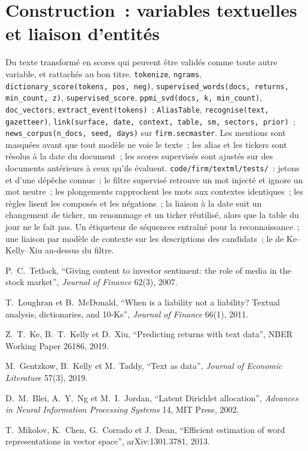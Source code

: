 \section{Construction~: variables textuelles et liaison d'entités}\label{bld:ml:text-from-bag-of-words-to-embeddings:textml}

\begin{build}
 Du texte transformé en scores qui peuvent être validés comme toute autre variable, et rattachés au bon titre.
 \texttt{tokenize}, \texttt{ngrams}, \texttt{dictionary\_score(tokens, pos, neg)},
\texttt{supervised\_words(docs, returns, min\_count, z)}, \texttt{supervised\_score},
\texttt{ppmi\_svd(docs, k, min\_count)}, \texttt{doc\_vectors}, \texttt{extract\_event(tokens)}~; \texttt{AliasTable},
\texttt{recognise(text, gazetteer)}, \texttt{link(surface, date, context, table, sm, sectors, prior)}~; \texttt{news\_corpus(n\_docs, seed, days)}
sur \texttt{firm.secmaster}.
 Les mentions sont masquées avant que tout modèle ne voie le texte~; les alias et les tickers sont résolus à la date du
document~; les scores supervisés sont ajustés sur des documents antérieurs à ceux qu'ils évaluent.
 \texttt{code/firm/textml/tests/}~: jetons et  d'une dépêche connue~; le filtre supervisé
retrouve un mot injecté et ignore un mot neutre~; les plongements rapprochent les mots aux contextes identiques~; les règles lisent
les composés et les négations~; la liaison à la date suit un changement de ticker, un renommage et un ticker réutilisé, alors que la table du jour ne
le fait pas.
 Un étiqueteur de séquences entraîné pour la reconnaissance~; une liaison par modèle de contexte sur les descriptions des candidats~;
le  de Ke--Kelly--Xiu au-dessus du filtre.
\end{build}

\begin{omsources}
\item P.~C.~Tetlock, ``Giving content to investor sentiment: the role of media in the stock market'', \emph{Journal of
Finance} 62(3), 2007.
\item T.~Loughran et B.~McDonald, ``When is a liability not a liability? Textual analysis, dictionaries, and 10-Ks'',
\emph{Journal of Finance} 66(1), 2011.
\item Z.~T.~Ke, B.~T.~Kelly et D.~Xiu, ``Predicting returns with text data'', NBER Working Paper 26186, 2019.
\item M.~Gentzkow, B.~Kelly et M.~Taddy, ``Text as data'', \emph{Journal of Economic Literature} 57(3), 2019.
\item D.~M.~Blei, A.~Y.~Ng et M.~I.~Jordan, ``Latent Dirichlet allocation'', \emph{Advances in Neural Information Processing
Systems} 14, MIT Press, 2002.
\item T.~Mikolov, K.~Chen, G.~Corrado et J.~Dean, ``Efficient estimation of word representations in vector space'',
arXiv:1301.3781, 2013.
\end{omsources}


